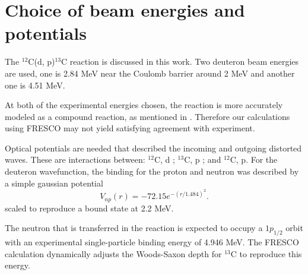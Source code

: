 \section{Choice of beam energies and potentials} \label{part1}
	The $^{12}$C(d, p)$^{13}$C reaction is discussed in this work. 
	Two deuteron beam energies are used, one is 2.84 MeV near the Coulomb barrier around 2 MeV and another one is 4.51 MeV.
	
	At both of the experimental energies chosen, the reaction is more accurately modeled as a compound reaction, as mentioned in \cite{PhysRev.101.209}.
	Therefore our calculations using FRESCO may not yield satisfying agreement with experiment.
	
	Optical potentials are needed that described the incoming and outgoing distorted waves.  
	These are interactions between: $^{12}$C, d \cite{PhysRevC.73.054605}; $^{13}$C, p \cite{PhysRevC.4.1114}; and $^{12}$C, p\cite{PTCOG}.
	For the deuteron wavefunction, the binding for the proton and neutron was described by a simple gaussian potential 
	\begin{equation}
		V_{np}(r)=-72.15e^{-(r/1.484)^2}.
	\end{equation}
	scaled to reproduce a bound state at 2.2 MeV.
	
	The neutron that is transferred in the reaction is expected to occupy a $1p_{1/2}$ orbit with an experimental single-particle binding energy of 4.946 MeV. 
	The FRESCO calculation dynamically adjusts the Woods-Saxon depth for $^{13}$C to reproduce this energy.
	
	